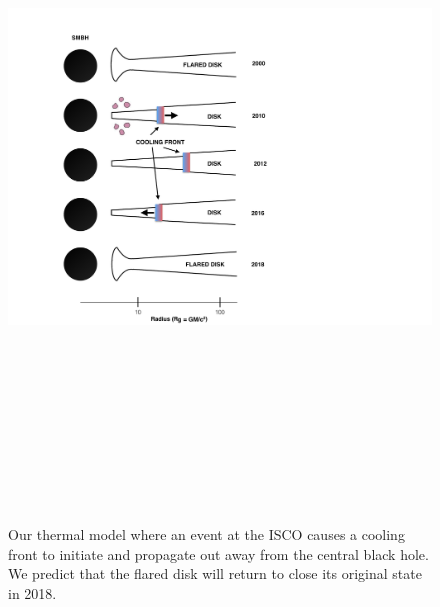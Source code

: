 \documentclass{nature}
\begin{document}
\begin{figure}
  \includegraphics[width=15.4cm, height=18.75cm, trim=0.0cm 0.0cm 0.0cm 0.0cm, clip]
  {../plots/models/cartoon_v2.pdf}
  \centering
  \caption[]{Our thermal model where an event at the ISCO causes a 
    cooling front to initiate and propagate out away from the central 
black hole. 
We predict that the flared disk will return to close its original state
in 2018.}
  \label{fig:J110057_diskmodel}
\end{figure}
\end{document}

